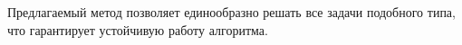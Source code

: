 \documentclass[12pt]{article}
\begin{document}
Предлагаемый метод позволяет единообразно решать все задачи подобного типа, что гарантирует устойчивую работу алгоритма.


%
%
%
%
%
\end{document}
